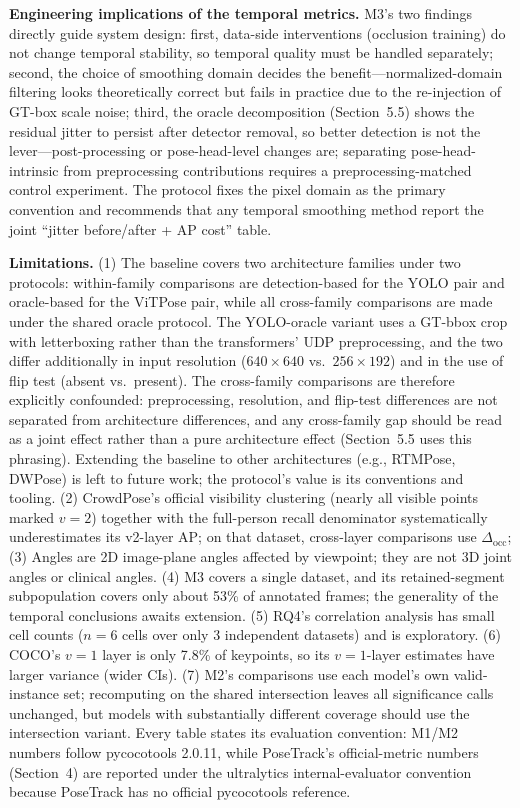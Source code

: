 \documentclass[10pt,conference]{IEEEtran}
\begin{document}
\textbf{Engineering implications of the temporal metrics.} M3's two findings directly guide system design: first, data-side interventions (occlusion training) do not change temporal stability, so temporal quality must be handled separately; second, the choice of smoothing domain decides the benefit---normalized-domain filtering looks theoretically correct but fails in practice due to the re-injection of GT-box scale noise; third, the oracle decomposition (Section~5.5) shows the residual jitter to persist after detector removal, so better detection is not the lever---post-processing or pose-head-level changes are; separating pose-head-intrinsic from preprocessing contributions requires a preprocessing-matched control experiment. The protocol fixes the pixel domain as the primary convention and recommends that any temporal smoothing method report the joint ``jitter before/after + AP cost'' table.

\textbf{Limitations.} (1) The baseline covers two architecture families under two protocols: within-family comparisons are detection-based for the YOLO pair and oracle-based for the ViTPose pair, while all cross-family comparisons are made under the shared oracle protocol. The YOLO-oracle variant uses a GT-bbox crop with letterboxing rather than the transformers' UDP preprocessing, and the two differ additionally in input resolution ($640\times640$ vs.\ $256\times192$) and in the use of flip test (absent vs.\ present). The cross-family comparisons are therefore explicitly confounded: preprocessing, resolution, and flip-test differences are not separated from architecture differences, and any cross-family gap should be read as a joint effect rather than a pure architecture effect (Section~5.5 uses this phrasing). Extending the baseline to other architectures (e.g., RTMPose, DWPose) is left to future work; the protocol's value is its conventions and tooling. (2) CrowdPose's official visibility clustering (nearly all visible points marked $v{=}2$) together with the full-person recall denominator systematically underestimates its v2-layer AP; on that dataset, cross-layer comparisons use $\Delta_{\mathrm{occ}}$; (3) Angles are 2D image-plane angles affected by viewpoint; they are not 3D joint angles or clinical angles. (4) M3 covers a single dataset, and its retained-segment subpopulation covers only about 53\% of annotated frames; the generality of the temporal conclusions awaits extension. (5) RQ4's correlation analysis has small cell counts ($n=6$ cells over only 3 independent datasets) and is exploratory. (6) COCO's $v{=}1$ layer is only 7.8\% of keypoints, so its $v{=}1$-layer estimates have larger variance (wider CIs). (7) M2's comparisons use each model's own valid-instance set; recomputing on the shared intersection leaves all significance calls unchanged, but models with substantially different coverage should use the intersection variant. Every table states its evaluation convention: M1/M2 numbers follow pycocotools 2.0.11, while PoseTrack's official-metric numbers (Section~4) are reported under the ultralytics internal-evaluator convention because PoseTrack has no official pycocotools reference.
\end{document}
